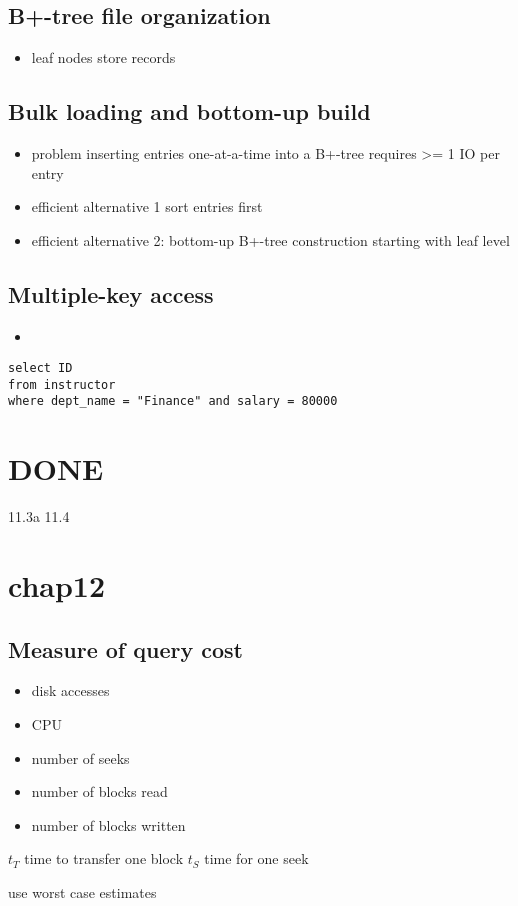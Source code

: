 \documentclass[11pt]{article}
\begin{document}
\subsection{B+-tree file organization}
\label{sec-16-4}
\begin{itemize}
\item leaf nodes store records
\end{itemize}
\subsection{Bulk loading and bottom-up build}
\label{sec-16-5}
\begin{itemize}
\item problem
inserting entries one-at-a-time into a B+-tree requires >= 1 IO per entry
\item efficient alternative 1
sort entries first
\item efficient alternative 2: bottom-up B+-tree construction
starting with leaf level
\end{itemize}
\subsection{Multiple-key access}
\label{sec-16-6}
\begin{itemize}
\item 
\end{itemize}
\lstset{language=SQL,label= ,caption= ,numbers=none}
\begin{lstlisting}
select ID
from instructor
where dept_name = "Finance" and salary = 80000
\end{lstlisting}
\section{{\bfseries\sffamily DONE} }
\label{sec-17}
11.3a 11.4
\section{chap12}
\label{sec-18}
\subsection{Measure of query cost}
\label{sec-18-1}
\begin{description}
\item[{factors}] \begin{itemize}
\item disk accesses
\item CPU
\item number of seeks
\item number of blocks read
\item number of blocks written
\end{itemize}
\item $t_T$ time to transfer one block
$t_S$ time for one seek
\item use worst case estimates
\end{description}
\end{document}

